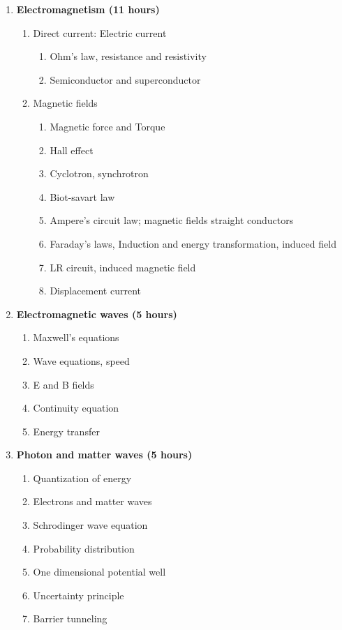 \begin{enumerate}
    \item \textbf{Electromagnetism \hfill (11 hours)}
    \begin{enumerate}
        \item Direct current: Electric current
        \begin{enumerate}
            \item Ohm's law, resistance and resistivity
            \item Semiconductor and superconductor
        \end{enumerate}
        
        \item Magnetic fields
        \begin{enumerate}
            \item Magnetic force and Torque
            \item Hall effect
            \item Cyclotron, synchrotron
            \item Biot-savart law
            \item Ampere's circuit law; magnetic fields straight conductors
            \item Faraday's laws, Induction and energy transformation, induced field
            \item LR circuit, induced magnetic field
            \item Displacement current
        \end{enumerate}
    \end{enumerate}
    
    \item \textbf{Electromagnetic waves \hfill (5 hours)}
    \begin{enumerate}
        \item Maxwell's equations
        \item Wave equations, speed
        \item E and B fields
        \item Continuity equation
        \item Energy transfer
    \end{enumerate}
    
    \item \textbf{Photon and matter waves \hfill (5 hours)}
    \begin{enumerate}
        \item Quantization of energy
        \item Electrons and matter waves
        \item Schrodinger wave equation
        \item Probability distribution
        \item One dimensional potential well
        \item Uncertainty principle
        \item Barrier tunneling
    \end{enumerate}
\end{enumerate}

